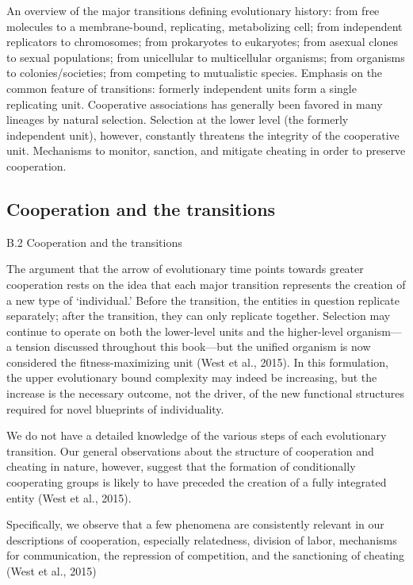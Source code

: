 \documentclass{tufte-book} %
\begin{document}
An overview of the major transitions defining evolutionary history: from free molecules to a membrane-bound, replicating, metabolizing cell; from independent replicators to chromosomes; from prokaryotes to eukaryotes; from asexual clones to sexual populations; from unicellular to multicellular organisms; from organisms to colonies/societies; from competing to mutualistic species. Emphasis on the common feature of transitions: formerly independent units form a single replicating unit. Cooperative associations has generally been favored in many lineages by natural selection. Selection at the lower level (the formerly independent unit), however, constantly threatens the integrity of the cooperative unit. Mechanisms to monitor, sanction, and mitigate cheating in order to preserve cooperation.

\subsection{Cooperation and the transitions}

B.2  Cooperation and the transitions

The argument that the arrow of evolutionary time points towards greater cooperation rests on the idea that each major transition represents the creation of a new type of ‘individual.’ Before the transition, the entities in question replicate separately; after the transition, they can only replicate together. Selection may continue to operate on both the lower-level units and the higher-level organism—a tension discussed throughout this book—but the unified organism is now considered the fitness-maximizing unit (West et al., 2015). In this formulation, the upper evolutionary bound complexity may indeed be increasing, but the increase is the necessary outcome, not the driver, of the new functional structures required for novel blueprints of individuality.


We do not have a detailed knowledge of the various steps of each evolutionary transition. Our general observations about the structure of cooperation and cheating in nature, however, suggest that the formation of conditionally cooperating groups is likely to have preceded the creation of a fully integrated entity (West et al., 2015). 


Specifically, we observe that a few phenomena are consistently relevant in our descriptions of cooperation, especially relatedness, division of labor, mechanisms for communication, the repression of competition, and the sanctioning of cheating  (West et al., 2015)
\end{document}
